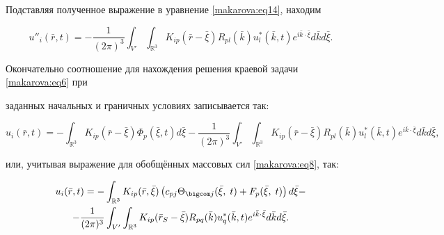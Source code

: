 Подставляя полученное выражение в уравнение \eqref{makarova:eq14}, находим

\begin{equation}

\label{makarova:eq29}

u''_i (\bar {r} , t)=-\frac{1}{(2\pi)^3}\int_{V'} \int_{\mathbb R^3} K_{ip} (\bar

{r}-\bar {\xi })R_{pl} (\bar {k})u_l^\ast (\bar{k} , t)e^{i\bar {k}\cdot \bar {\xi }}d\bar {k} d\bar {\xi }.

\end{equation}

Окончательно соотношение для нахождения решения краевой задачи \eqref{makarova:eq6} при

заданных начальных и граничных условиях записывается так:



$$

u_i (\bar {r} , t)=-\int_{\mathbb R^3} K_{ip} (\bar {r}-\bar {\xi})\Phi

_p (\bar {\xi } , t) d\bar {\xi }- \frac{1}{(2\pi )^3}\int_{V'}

\int_{\mathbb R^3} K_{ip} (\bar {r}-\bar {\xi })R_{pl} (\bar {k})u_l^\ast

(\bar {k},t) e^{i \bar {k}\cdot \bar {\xi }}d\bar {k} d\bar {\xi},


$$

или, учитывая выражение для обобщённых массовых сил \eqref{makarova:eq8}, так:

\begin{multline}

\label{makarova:eq31}

u_i (\bar {r} , t)=-\int_{\mathbb R^3} K_{ip} (\bar {r} , \bar {\xi })

\left( c_{pj} \Theta_{\bigcom j} (\bar {\xi},\;t)+F_p (\bar {\xi},\;t)

\right) d\bar {\xi }- \\

-\frac{1}{(2\pi )^3}\int_{V'}

\int_{\mathbb R^3} K_{ip} (\bar {r}_S -\bar {\xi })R_{pq} (\bar

{k}) u_q^\ast (\bar {k} , t)e^{i\bar {k}\cdot \bar {\xi }}d\bar {k}

d\bar {\xi }.

\end{multline}

